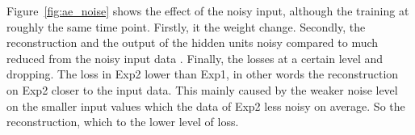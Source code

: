 \DIFdelend Figure~\ref{fig:ae_noise} shows the effect of the noisy input, although the training \DIFdelbegin {}\DIFdelend \DIFaddbegin {}\DIFaddend at roughly the same time point.
Firstly, it \DIFdelbegin {}\DIFdelend \DIFaddbegin {}\DIFaddend the weight change.
Secondly, the reconstruction and the output of the hidden units \DIFdelbegin {}\DIFdelend \DIFaddbegin {}\DIFaddend noisy compared to \DIFdelbegin {}\DIFdelend \DIFaddbegin {}\DIFaddend much reduced from the noisy input data \DIFdelbegin {}\DIFdelend \DIFaddbegin {}\DIFaddend . 
Finally, the losses \DIFdelbegin {}\DIFdelend \DIFaddbegin {}\DIFaddend at a certain level and \DIFdelbegin {}\DIFdelend \DIFaddbegin {}\DIFaddend dropping.
The loss in Exp2 \DIFdelbegin {}\DIFdelend \DIFaddbegin {}\DIFaddend lower than Exp1, in other words the reconstruction on Exp2 \DIFdelbegin {}\DIFdelend \DIFaddbegin {}\DIFaddend closer to the input data.
This \DIFdelbegin {}\DIFdelend \DIFaddbegin {}\DIFaddend mainly caused by the weaker noise level on the smaller input values which \DIFdelbegin {}\DIFdelend \DIFaddbegin {}\DIFaddend the data of Exp2 less noisy on average.
So \DIFdelbegin {}\DIFdelend \DIFaddbegin {}\DIFaddend the reconstruction, which \DIFdelbegin {}\DIFdelend \DIFaddbegin {}\DIFaddend to the lower level of loss.
